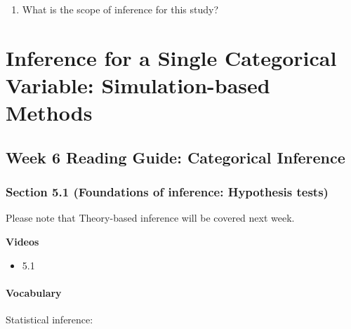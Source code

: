 \documentclass[
]{report}
\providecommand{\tightlist}{%
  \setlength{\itemsep}{0pt}\setlength{\parskip}{0pt}}
\newcommand{\rgs}{\vspace{12pt}} %
\begin{document}
\vspace{0.5in}

\begin{enumerate}
\def\labelenumi{\alph{enumi}.}
\setcounter{enumi}{12}
\tightlist
\item
  What is the scope of inference for this study?
\end{enumerate}

\newpage

\hypertarget{inference-for-a-single-categorical-variable-simulation-based-methods}{%
\chapter{Inference for a Single Categorical Variable: Simulation-based Methods}\label{inference-for-a-single-categorical-variable-simulation-based-methods}}

\hypertarget{week-6-reading-guide-categorical-inference}{%
\section{Week 6 Reading Guide: Categorical Inference}\label{week-6-reading-guide-categorical-inference}}

\hypertarget{section-5.1-foundations-of-inference-hypothesis-tests}{%
\subsection*{Section 5.1 (Foundations of inference: Hypothesis tests)}\label{section-5.1-foundations-of-inference-hypothesis-tests}}

Please note that Theory-based inference will be covered next week.

\textbf{Videos}

\begin{itemize}
\tightlist
\item
  5.1
\end{itemize}


\hypertarget{vocabulary-9}{%
\subsubsection*{Vocabulary}\label{vocabulary-9}}

Statistical inference:
\rgs
\end{document}
